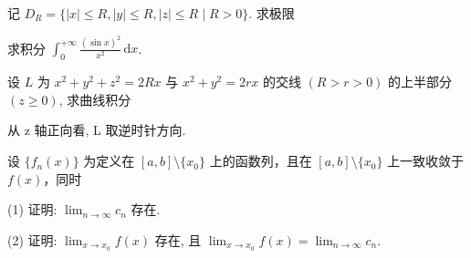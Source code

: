 \par{}
记 $D_{R} = \{|x| \leq R, |y| \leq R, |z| \leq R \mid R > 0\}$. 求极限\par
\nopagebreak[4]
求积分 $\int_0^{+\infty} \frac{(\sin x)^2}{x^2} \, \mathrm{d}x$.\par
\par{}
设 $L$ 为 $x^{2} + y^{2} + z^{2} = 2Rx$ 与 $x^{2} + y^{2} = 2rx$ 的交线 $(R > r > 0)$ 的上半部分 $(z \geq 0)$, 求曲线积分\par
\nopagebreak[4]
从 z 轴正向看, L 取逆时针方向.\par
\par{}
设 $\{f_n(x)\}$ 为定义在 $[a, b] \setminus \{x_0\}$ 上的函数列，且在 $[a, b] \setminus \{x_0\}$ 上一致收敛于 $f(x)$，同时\par
\nopagebreak[4]
(1) 证明: $\lim_{n\to \infty}c_n$ 存在.\par
(2) 证明: $\lim_{x \to x_0} f(x)$ 存在, 且 $\lim_{x \to x_0} f(x) = \lim_{n \to \infty} c_n$.\par
